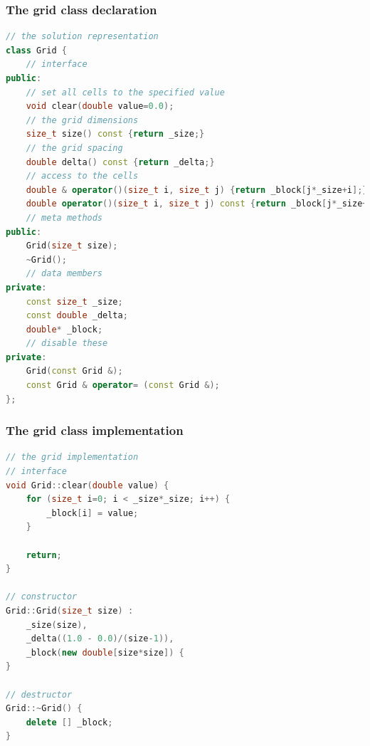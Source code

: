 %
%


\begin{frame}[fragile]
%
  \frametitle{The grid class declaration}
%
  \begin{lstlisting}[language=c++,name=seq:grid,firstnumber=29]
// the solution representation
class Grid {
    // interface
public:
    // set all cells to the specified value
    void clear(double value=0.0);
    // the grid dimensions
    size_t size() const {return _size;}
    // the grid spacing
    double delta() const {return _delta;}
    // access to the cells
    double & operator()(size_t i, size_t j) {return _block[j*_size+i];}
    double operator()(size_t i, size_t j) const {return _block[j*_size+i];}
    // meta methods
public:
    Grid(size_t size);
    ~Grid();
    // data members
private:
    const size_t _size;
    const double _delta;
    double* _block;
    // disable these
private:
    Grid(const Grid &);
    const Grid & operator= (const Grid &);
};

  \end{lstlisting}
%
\end{frame}

\begin{frame}[fragile]
%
  \frametitle{The grid class implementation}
%
  \begin{lstlisting}[language=c++,name=seq:grid]
// the grid implementation
// interface
void Grid::clear(double value) {
    for (size_t i=0; i < _size*_size; i++) {
        _block[i] = value;
    }

    return;
}

// constructor
Grid::Grid(size_t size) :
    _size(size), 
    _delta((1.0 - 0.0)/(size-1)),
    _block(new double[size*size]) {
}

// destructor
Grid::~Grid() {
    delete [] _block;
}

  \end{lstlisting}
%
\end{frame}

